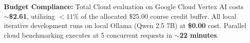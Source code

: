 \textbf{Budget Compliance:} Total Cloud evaluation on Google Cloud Vertex AI costs \textbf{$\sim$\$2.61}, utilizing $<11\%$ of the allocated \$25.00 course credit buffer. All local iterative development runs on local Ollama (Qwen 2.5 7B) at \textbf{\$0.00} cost. Parallel cloud benchmarking executes at 5 concurrent requests in \textbf{$\sim$22 minutes}.
